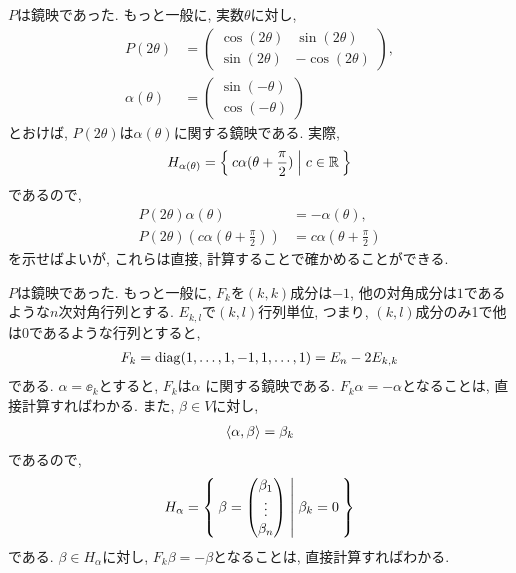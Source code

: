 \begin{example}
  \label{ex:i2m:ref}
  $P$は鏡映であった.
  もっと一般に,
  実数$\theta$に対し,
\begin{align*}
  P(2\theta)&=
  \begin{pmatrix}
    \cos(2\theta) & \sin(2\theta) \\
    \sin(2\theta) & -\cos(2\theta) 
  \end{pmatrix},\\
  \alpha(\theta)
  &=
  \begin{pmatrix}
    \sin(-\theta) \\
    \cos(-\theta) 
  \end{pmatrix}
\end{align*}
とおけば, $P(2\theta)$は$\alpha(\theta)$に関する鏡映である.
実際,
\begin{align*}
  H_{\alpha(\theta)} = \Set{c \alpha(\theta+\frac{\pi}{2})|c\in \mathbb{R}} 
\end{align*}
であるので,
\begin{align*}
  P(2\theta)\alpha(\theta) &= - \alpha(\theta),\\
  P(2\theta)(c\alpha(\theta+\frac{\pi}{2})) &= c\alpha(\theta+\frac{\pi}{2})
\end{align*}
を示せばよいが, これらは直接, 計算することで確かめることができる.
\end{example}


\begin{example}
  \label{ex:a1n:refl}
  $P$は鏡映であった.
  もっと一般に,
  $F_k$を$(k,k)$成分は$-1$, 他の対角成分は$1$であるような$n$次対角行列とする.
 $E_{k,l}$で$(k,l)$行列単位, つまり, $(k,l)$成分のみ1で他は0であるような行列とすると,
  \begin{align*}
    F_k = \operatorname{diag}(1,\ldots,1,-1,1,\ldots,1)=E_n-2E_{k,k}
  \end{align*}
  である.
  $\alpha=\ee_k$とすると, $F_k$は$\alpha$ に関する鏡映である.
  $F_k \alpha = -\alpha$となることは, 直接計算すればわかる.
  また, $\beta\in V$に対し,
  \begin{align*}
    \Braket{\alpha,\beta}= \beta_k 
  \end{align*}
  であるので,
  \begin{align*}
    H_\alpha = \Set{
      \beta=
      \begin{pmatrix}
        \beta_1\\
        \vdots\\
        \beta_n
      \end{pmatrix}
      | \beta_k=0}
  \end{align*}
  である.  $\beta\in H_\alpha$に対し, 
  $F_k \beta = -\beta$となることは, 直接計算すればわかる.
\end{example}

